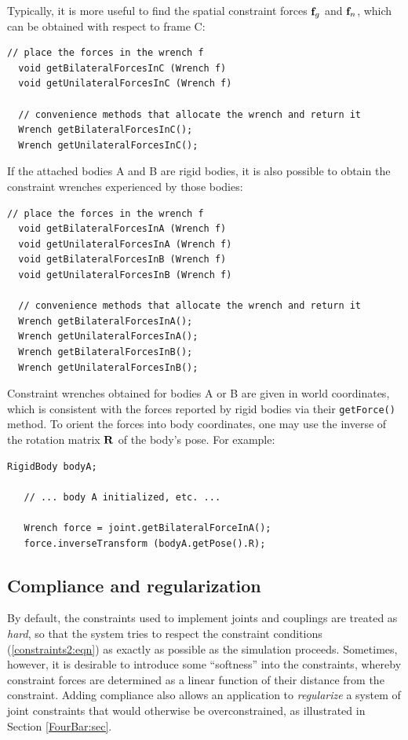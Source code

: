 Typically, it is more useful to find the spatial constraint forces
${\bf f}_g$ and ${\bf f}_n$, which can be obtained with respect to frame C:
\begin{lstlisting}[]
  // place the forces in the wrench f
  void getBilateralForcesInC (Wrench f)
  void getUnilateralForcesInC (Wrench f)

  // convenience methods that allocate the wrench and return it
  Wrench getBilateralForcesInC();
  Wrench getUnilateralForcesInC();
\end{lstlisting}
%
If the attached bodies A and B are rigid bodies, it is also possible
to obtain the constraint wrenches experienced by those bodies:
\begin{lstlisting}[]
  // place the forces in the wrench f
  void getBilateralForcesInA (Wrench f)
  void getUnilateralForcesInA (Wrench f)
  void getBilateralForcesInB (Wrench f)
  void getUnilateralForcesInB (Wrench f)

  // convenience methods that allocate the wrench and return it
  Wrench getBilateralForcesInA();
  Wrench getUnilateralForcesInA();
  Wrench getBilateralForcesInB();
  Wrench getUnilateralForcesInB();
\end{lstlisting}
%
Constraint wrenches obtained for bodies A or B are given in world
coordinates, which is consistent with the forces reported by rigid
bodies via their {\tt getForce()} method. To orient the forces into
body coordinates, one may use the inverse of the rotation matrix ${\bf R}$
of the body's pose. For example:
%
\begin{lstlisting}[]
   RigidBody bodyA;

   // ... body A initialized, etc. ...

   Wrench force = joint.getBilateralForceInA();
   force.inverseTransform (bodyA.getPose().R);
\end{lstlisting}
%

\subsection{Compliance and regularization}
\label{JointCompliance:sec}

By default, the constraints used to implement joints and couplings are
treated as {\it hard}, so that the system tries to respect the
constraint conditions (\ref{constraints2:eqn}) as exactly as possible
as the simulation proceeds.  Sometimes, however, it is desirable to
introduce some ``softness'' into the constraints, whereby constraint
forces are determined as a linear function of their distance from the
constraint. Adding compliance also allows an application to {\it
regularize} a system of joint constraints that would otherwise be
overconstrained, as illustrated in Section \ref{FourBar:sec}.

